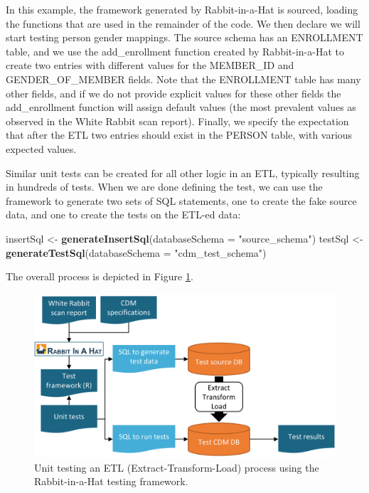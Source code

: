 \documentclass[11pt]{book}
\newenvironment{Shaded}{\begin{snugshade}}{\end{snugshade}}
\newcommand{\DataTypeTok}[1]{\textcolor[rgb]{0.13,0.29,0.53}{#1}}
\newcommand{\KeywordTok}[1]{\textcolor[rgb]{0.13,0.29,0.53}{\textbf{#1}}}
\newcommand{\NormalTok}[1]{#1}
\newcommand{\StringTok}[1]{\textcolor[rgb]{0.31,0.60,0.02}{#1}}
\theoremstyle{definition}
\theoremstyle{definition}
\theoremstyle{definition}
\theoremstyle{remark}
\begin{document}
In this example, the framework generated by Rabbit-in-a-Hat is sourced, loading the functions that are used in the remainder of the code. We then declare we will start testing person gender mappings. The source schema has an ENROLLMENT table, and we use the add\_enrollment function created by Rabbit-in-a-Hat to create two entries with different values for the MEMBER\_ID and GENDER\_OF\_MEMBER fields. Note that the ENROLLMENT table has many other fields, and if we do not provide explicit values for these other fields the add\_enrollment function will assign default values (the most prevalent values as observed in the White Rabbit scan report). Finally, we specify the expectation that after the ETL two entries should exist in the PERSON table, with various expected values.

Similar unit tests can be created for all other logic in an ETL, typically resulting in hundreds of tests. When we are done defining the test, we can use the framework to generate two sets of SQL statements, one to create the fake source data, and one to create the tests on the ETL-ed data:

\begin{Shaded}
\begin{Highlighting}[]
\NormalTok{insertSql <-}\StringTok{ }\KeywordTok{generateInsertSql}\NormalTok{(}\DataTypeTok{databaseSchema =} \StringTok{"source_schema"}\NormalTok{)}
\NormalTok{testSql <-}\StringTok{ }\KeywordTok{generateTestSql}\NormalTok{(}\DataTypeTok{databaseSchema =} \StringTok{"cdm_test_schema"}\NormalTok{)}
\end{Highlighting}
\end{Shaded}

The overall process is depicted in Figure \ref{fig:testFramework}.

\begin{figure}

{\centering \includegraphics[width=0.9\linewidth]{images/DataQuality/testFramework} 

}

\caption{Unit testing an ETL (Extract-Transform-Load) process using the Rabbit-in-a-Hat testing framework.}\label{fig:testFramework}
\end{figure}
\end{document}
